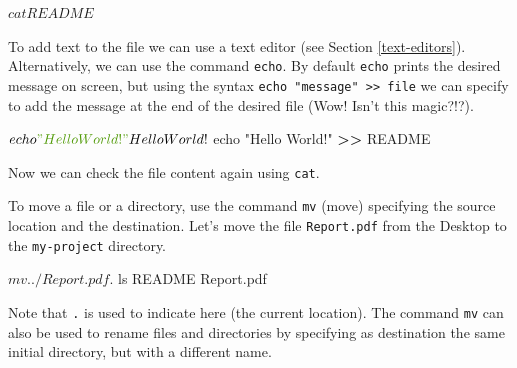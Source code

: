 \documentclass[
  11pt,
]{book}
\newenvironment{Shaded}{\begin{snugshade}}{\end{snugshade}}
\newcommand{\ExtensionTok}[1]{#1}
\newcommand{\NormalTok}[1]{#1}
\newcommand{\OperatorTok}[1]{\textcolor[rgb]{0.81,0.36,0.00}{\textbf{#1}}}
\newcommand{\StringTok}[1]{\textcolor[rgb]{0.31,0.60,0.02}{#1}}
\begin{document}
\begin{Shaded}
\begin{Highlighting}[]
\ExtensionTok{$}\NormalTok{ cat README}
\ExtensionTok{$}
\end{Highlighting}
\end{Shaded}

To add text to the file we can use a text editor (see Section \ref{text-editors}). Alternatively, we can use the command \texttt{echo}. By default \texttt{echo} prints the desired message on screen, but using the syntax \texttt{echo\ "message"\ \textgreater{}\textgreater{}\ file} we can specify to add the message at the end of the desired file (Wow! Isn't this magic?!?).

\begin{Shaded}
\begin{Highlighting}[]
\ExtensionTok{$}\NormalTok{ echo }\StringTok{"Hello World!"}
\ExtensionTok{Hello}\NormalTok{ World!}
\ExtensionTok{$}\NormalTok{ echo }\StringTok{"Hello World!"} \OperatorTok{\textgreater{}\textgreater{}}\NormalTok{ README}
\end{Highlighting}
\end{Shaded}

Now we can check the file content again using \texttt{cat}.

\begin{Shaded}
\end{Shaded}

To move a file or a directory, use the command \texttt{mv} (move) specifying the source location and the destination. Let's move the file \texttt{Report.pdf} from the Desktop to the \texttt{my-project} directory.

\begin{Shaded}
\begin{Highlighting}[]
\ExtensionTok{$}\NormalTok{ mv ../Report.pdf .}
\ExtensionTok{$}\NormalTok{ ls}
\ExtensionTok{README}\NormalTok{                Report.pdf}
\end{Highlighting}
\end{Shaded}

Note that \texttt{.} is used to indicate here (the current location). The command \texttt{mv} can also be used to rename files and directories by specifying as destination the same initial directory, but with a different name.
\end{document}
